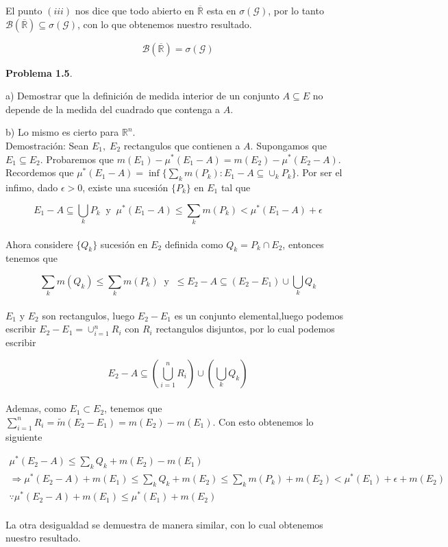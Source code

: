 \documentclass[12pt]{article}
\begin{document}
    El punto $(iii)$ nos dice que todo abierto en $\overline{\mathbb{R}}$ esta en 
    $\sigma(\mathcal{G})$, por lo tanto 
    $\mathscr{B}(\overline{\mathbb{R}})\subseteq \sigma(\mathcal{G})$, con lo que obtenemos 
    nuestro resultado.

    \[\mathscr{B}(\overline{\mathbb{R}}) = \sigma(\mathcal{G})\]
    \newpage

    \textbf{Problema 1.5}. 
    
    a) Demostrar que la definici\'on de medida interior de un conjunto 
    $A\subseteq E$ no depende de \hspace*{28pt} la medida del cuadrado que contenga a $A$.

    b) Lo mismo es cierto para $\mathbb{R}^n$.
    \\

    Demostraci\'on: Sean $E_1,\; E_2$ rectangulos que contienen a $A$. Supongamos que 
    $E_1\subseteq E_2$. Probaremos que $m(E_1)-\mu^*(E_1-A) = m(E_2)-\mu^*(E_2-A)$.
    \\

    Recordemos que $\mu^*(E_1-A) = \inf\{\sum_k m(P_k) : E_1-A\subseteq \cup_k P_k\}$. Por 
    ser el infimo, dado $\epsilon > 0$, existe una sucesi\'on $\{P_k\}$ en $E_1$ tal que 

    \[E_1-A\subseteq \bigcup_k P_k \;\; \mathrm{y}\;\; \mu^*(E_1-A) \leq \sum_k m(P_k) < \mu^*(E_1-A)+\epsilon\]
    \\
    Ahora considere $\{Q_k\}$ sucesi\'on en $E_2$ definida como 
    $Q_k = P_k\cap E_2$, entonces tenemos que 

    \[\sum_k m(Q_k) \leq \sum_k m(P_k)\;\; \mathrm{y}\;\; \leq E_2-A\subseteq (E_2-E_1)\cup\bigcup_k Q_k\]
    \\
    $E_1$ y $E_2$ son rectangulos, luego $E_2-E_1$ es un conjunto elemental,luego podemos 
    escribir $E_2-E_1 = \cup_{i=1}^nR_i$ con $R_i$ rectangulos disjuntos, por lo cual podemos 
    escribir 

    \[E_2-A \subseteq \left(\bigcup_{i=1}^nR_i\right)\cup \left(\bigcup_k Q_k\right)\]
    \\
    Ademas, como $E_1\subset E_2$, tenemos que  
    $\sum_{i=1}^nR_i = \tilde{m} (E_2-E_1) = m(E_2)-m(E_1)$. Con esto obtenemos lo siguiente

    \begin{gather*}
        \mu^* (E_2-A) \leq \sum_k Q_k+m(E_2)-m(E_1) \\
        \Rightarrow \mu^* (E_2-A)+m(E_1) \leq \sum_k Q_k+m(E_2) \leq \sum_k m(P_k)+m(E_2) < \mu^*(E_1)+\epsilon+m(E_2) \\
        \because \mu^* (E_2-A)+m(E_1) \leq \mu^*(E_1)+m(E_2)
    \end{gather*}
    \\
    La otra desigualdad se demuestra de manera similar, con lo cual obtenemos nuestro 
    resultado.
    \\
\end{document}
